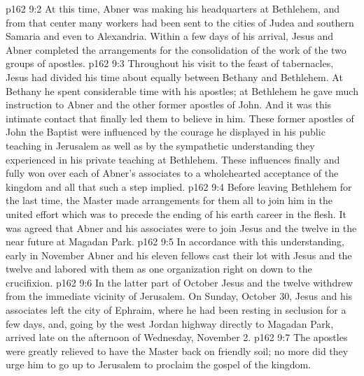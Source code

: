 \vs p162 9:2 \pc At this time, Abner was making his headquarters at Bethlehem, and from that center many workers had been sent to the cities of Judea and southern Samaria and even to Alexandria. Within a few days of his arrival, Jesus and Abner completed the arrangements for the consolidation of the work of the two groups of apostles.
\vs p162 9:3 Throughout his visit to the feast of tabernacles, Jesus had divided his time about equally between Bethany and Bethlehem. At Bethany he spent considerable time with his apostles; at Bethlehem he gave much instruction to Abner and the other former apostles of John. And it was this intimate contact that finally led them to believe in him. These former apostles of John the Baptist were influenced by the courage he displayed in his public teaching in Jerusalem as well as by the sympathetic understanding they experienced in his private teaching at Bethlehem. These influences finally and fully won over each of Abner’s associates to a wholehearted acceptance of the kingdom and all that such a step implied.
\vs p162 9:4 \pc Before leaving Bethlehem for the last time, the Master made arrangements for them all to join him in the united effort which was to precede the ending of his earth career in the flesh. It was agreed that Abner and his associates were to join Jesus and the twelve in the near future at Magadan Park.
\vs p162 9:5 In accordance with this understanding, early in November Abner and his eleven fellows cast their lot with Jesus and the twelve and labored with them as one organization right on down to the crucifixion.
\vs p162 9:6 In the latter part of October Jesus and the twelve withdrew from the immediate vicinity of Jerusalem. On Sunday, October 30, Jesus and his associates left the city of Ephraim, where he had been resting in seclusion for a few days, and, going by the west Jordan highway directly to Magadan Park, arrived late on the afternoon of Wednesday, November 2.
\vs p162 9:7 The apostles were greatly relieved to have the Master back on friendly soil; no more did they urge him to go up to Jerusalem to proclaim the gospel of the kingdom.
